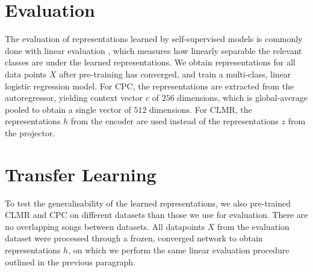 \documentclass{report}
\begin{document}
\section{Evaluation}
\label{evaluation}
The evaluation of representations learned by self-supervised models is commonly done with linear evaluation \cite{oord_representation_2019,hjelm_learning_2019,chen_simple_2020}, which measures how linearly separable the relevant classes are under the learned representations. We obtain representations for all data points $X$ after pre-training has converged, and train a multi-class, linear logistic regression model. For CPC, the representations are extracted from the autoregressor, yielding context vector $c$ of $256$ dimensions, which is global-average pooled to obtain a single vector of $512$ dimensions. For CLMR, the representations $h$ from the encoder are used instead of the representations $z$ from the projector. 


\section{Transfer Learning}
To test the generalisability of the learned representations, we also pre-trained CLMR and CPC on different datasets than those we use for evaluation. There are no overlapping songs between datasets. All datapoints $X$ from the evaluation dataset were processed through a frozen, converged network to obtain representations $h$, on which we perform the same linear evaluation procedure outlined in the previous paragraph. 
\end{document}
